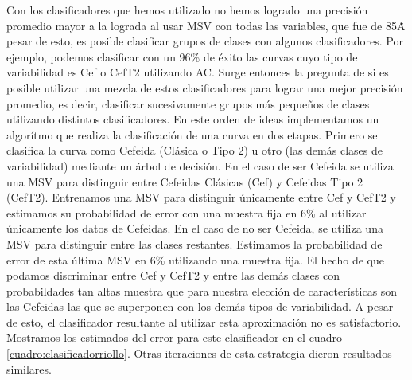 \documentclass[letterpaper,12pt]{book}
\begin{document}
Con los clasificadores que hemos utilizado no hemos logrado una precisión promedio mayor a la lograda al usar MSV con todas las variables, que fue de 85\. A pesar de esto, es posible clasificar grupos de clases con algunos clasificadores. Por ejemplo, podemos clasificar con un 96\% de éxito las curvas cuyo tipo de variabilidad es Cef o CefT2 utilizando AC.  Surge entonces la pregunta de si es posible utilizar una mezcla de estos clasificadores para lograr una mejor precisión promedio, es decir, clasificar sucesivamente grupos más pequeños de clases utilizando distintos clasificadores. En este orden de ideas implementamos un algorítmo que realiza la clasificación de una curva en dos etapas. Primero se clasifica la curva como Cefeida (Clásica o Tipo 2) u otro (las demás clases de variabilidad) mediante un árbol de decisión. En el caso de ser Cefeida se utiliza una MSV para distinguir entre Cefeidas Clásicas (Cef) y Cefeidas Tipo 2 (CefT2). Entrenamos una MSV para distinguir únicamente entre Cef y CefT2 y estimamos su probabilidad de error con una muestra fija en 6\% al utilizar únicamente los datos de Cefeidas. En el caso de no ser Cefeida, se utiliza una MSV para distinguir entre las clases restantes. Estimamos la probabilidad de error de esta última MSV en 6\% utilizando una muestra fija. El hecho de que podamos discriminar entre Cef y CefT2 y entre las demás clases con probabildades tan altas muestra que para nuestra elección de características son las Cefeidas las que se superponen con los demás tipos de variabilidad.  A pesar de esto, el clasificador resultante al utilizar esta aproximación no es satisfactorio. Mostramos los estimados del error para este clasificador en el cuadro \ref{cuadro:clasificadorriollo}. Otras iteraciones de esta estrategia dieron resultados similares. 
\end{document}
